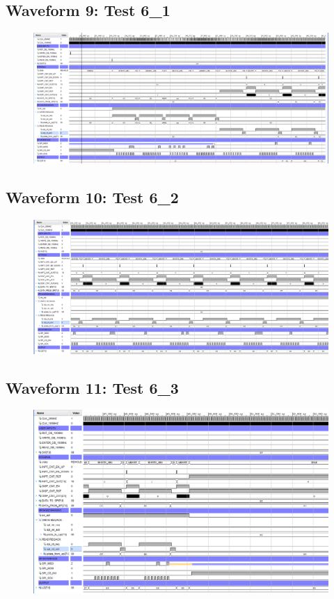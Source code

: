 \documentclass[11pt]{report}
\begin{document}
\subsection*{Waveform 9: Test 6\_1}
\begin{figure}[H]
    \includegraphics[width=\columnwidth]{Reports/Proj/Task3/Assets/Test6_1.PNG}
\end{figure}

\subsection*{Waveform 10: Test 6\_2}
\begin{figure}[H]
    \includegraphics[width=\columnwidth]{Reports/Proj/Task3/Assets/Test6_2.PNG}
\end{figure}

\subsection*{Waveform 11: Test 6\_3}
\begin{figure}[H]
    \includegraphics[width=\columnwidth]{Reports/Proj/Task3/Assets/Test6_3.PNG}
\end{figure}
\end{document}

